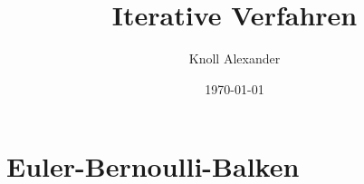 \documentclass[12pt,titlepage]{article}
\author{Knoll Alexander }
\title{Iterative Verfahren}
\date{\today}
\begin{document}
\maketitle

\part*{Euler-Bernoulli-Balken}



%
%



\end{document}
